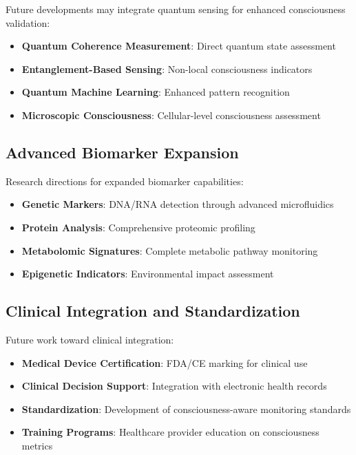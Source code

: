 \documentclass[12pt,a4paper]{article}
\begin{document}
Future developments may integrate quantum sensing for enhanced consciousness validation:

\begin{itemize}
\item \textbf{Quantum Coherence Measurement}: Direct quantum state assessment
\item \textbf{Entanglement-Based Sensing}: Non-local consciousness indicators
\item \textbf{Quantum Machine Learning}: Enhanced pattern recognition
\item \textbf{Microscopic Consciousness}: Cellular-level consciousness assessment
\end{itemize}

\subsection{Advanced Biomarker Expansion}

Research directions for expanded biomarker capabilities:

\begin{itemize}
\item \textbf{Genetic Markers}: DNA/RNA detection through advanced microfluidics
\item \textbf{Protein Analysis}: Comprehensive proteomic profiling
\item \textbf{Metabolomic Signatures}: Complete metabolic pathway monitoring
\item \textbf{Epigenetic Indicators}: Environmental impact assessment
\end{itemize}

\subsection{Clinical Integration and Standardization}

Future work toward clinical integration:

\begin{itemize}
\item \textbf{Medical Device Certification}: FDA/CE marking for clinical use
\item \textbf{Clinical Decision Support}: Integration with electronic health records
\item \textbf{Standardization}: Development of consciousness-aware monitoring standards
\item \textbf{Training Programs}: Healthcare provider education on consciousness metrics
\end{itemize}
\end{document}
